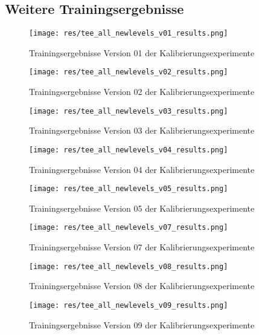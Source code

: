 \documentclass[11pt]{scrartcl}
\begin{document}
\subsection{Weitere Trainingsergebnisse}
\label{sec:further_train_results}

\begin{figure}[htp]
\centering
\texttt{[image: res/tee\_all\_newlevels\_v01\_results.png]}
\caption{Trainingsergebnisse Version 01 der Kalibrierungsexperimente}
\end{figure}

\begin{figure}[htp]
\texttt{[image: res/tee\_all\_newlevels\_v02\_results.png]}
\caption{Trainingsergebnisse Version 02 der Kalibrierungsexperimente}
\end{figure}

\begin{figure}[htp]
\texttt{[image: res/tee\_all\_newlevels\_v03\_results.png]}
\caption{Trainingsergebnisse Version 03 der Kalibrierungsexperimente}
\end{figure}

\begin{figure}[htp]
\texttt{[image: res/tee\_all\_newlevels\_v04\_results.png]}
\caption{Trainingsergebnisse Version 04 der Kalibrierungsexperimente}
\end{figure}

\begin{figure}[htp]
\texttt{[image: res/tee\_all\_newlevels\_v05\_results.png]}
\caption{Trainingsergebnisse Version 05 der Kalibrierungsexperimente}
\end{figure}

\begin{figure}[htp]
\texttt{[image: res/tee\_all\_newlevels\_v07\_results.png]}
\caption{Trainingsergebnisse Version 07 der Kalibrierungsexperimente}
\end{figure}

\begin{figure}[htp]
\texttt{[image: res/tee\_all\_newlevels\_v08\_results.png]}
\caption{Trainingsergebnisse Version 08 der Kalibrierungsexperimente}
\end{figure}

\begin{figure}[htp]
\texttt{[image: res/tee\_all\_newlevels\_v09\_results.png]}
\caption{Trainingsergebnisse Version 09 der Kalibrierungsexperimente}
\end{figure}
\end{document}
